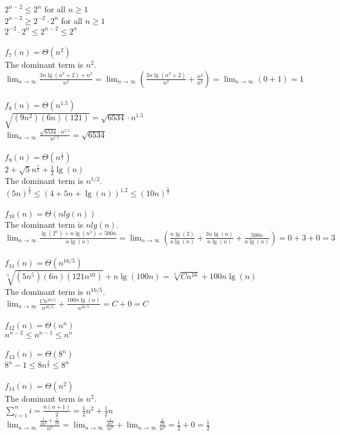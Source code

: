 \documentclass[14pt]{extarticle}
\begin{document}
$2^{n-2} \leq 2^n$ for all $n \geq 1$ \\
$2^{n-2} \geq 2^{-2} \cdot 2^n$ for all $n \geq 1$ \\
$2^{-2} \cdot 2^n \leq 2^{n-2} \leq 2^n$ \\ \\
$f_7(n) = \Theta(n^2)$ \\
The dominant term is $n^2$. \\
$\lim_{n \to \infty} \frac{3n\lg(n^2+2)+n^2}{n^2} = \lim_{n \to \infty} \left(\frac{3n\lg(n^2+2)}{n^2} + \frac{n^2}{n^2}\right) = \lim_{n \to \infty} (0 + 1) = 1$\\ \\
$f_8(n) = \Theta(n^{1.5})$ \\
$\sqrt{(9n^2)(6n)(121)} = \sqrt{6534} \cdot n^{1.5}$ \\
$\lim_{n \to \infty} \frac{\sqrt{6534} \cdot n^{1.5}}{n^{1.5}} = \sqrt{6534}$ \\ \\
$f_9(n) = \Theta(n^\frac{1}{2})$ \\
$2 + \sqrt{5}n^{\frac{1}{2}} + \frac{1}{2}\lg(n)$ \\
The dominant term is $n^{1/2}$. \\
$(5n)^{\frac{1}{2}} \leq (4 + 5n + \lg(n))^{1.2} \leq (10n)^{\frac{1}{2}}$ \\ \\
$f_{10}(n) = \Theta(n lg(n))$ \\
The dominant term is $n lg(n)$. \\
$\lim_{n \to \infty} \frac{\lg(2^n) + n\lg(n^3) + 500n}{n\lg(n)} = \lim_{n \to \infty} (\frac{n\lg(2)}{n\lg(n)} + \frac{3n\lg(n)}{n\lg(n)} + \frac{500n}{n\lg(n)}) = 0 + 3 + 0 = 3$\\ \\
$f_{11}(n) = \Theta(n^{16/5})$ \\
$\sqrt[5]{(5n^5)(6n)(121n^{10})} + n\lg(100n) = \sqrt[5]{Cn^{16}} + 100n\lg(n)$ \\
The dominant term is $n^{16/5}$. \\
$\lim_{n \to \infty} \frac{Cn^{16/5}}{n^{16/5}} + \frac{100n\lg(n)}{n^{16/5}} = C + 0 = C$ \\ \\
$f_{12}(n) = \Theta(n^n)$ \\
$n^{n-2} \leq n^{n-1} \leq n^n$ \\ \\
$f_{13}(n) = \Theta(8^n)$ \\
$8^n - 1 \leq 8n^{\frac{1}{2}} \leq 8^n$ \\ \\
$f_{14}(n) = \Theta(n^2)$ \\
The dominant term is $n^2$. \\
$\sum_{i=1}^{n} i = \frac{n(n + 1)}{2} = \frac{1}{2}n^2 + \frac{1}{2}n$ \\
$\lim_{n \to \infty} \frac{\frac{1}{2n^2} + \frac{1}{2n}}{n^2} = \lim_{n \to \infty} \frac{\frac{1}{2n^2}}{n^2} + \lim_{n \to \infty} \frac{\frac{1}{2n}}{n^2} = \frac{1}{2} + 0 = \frac{1}{2}$ \\
\end{document}
